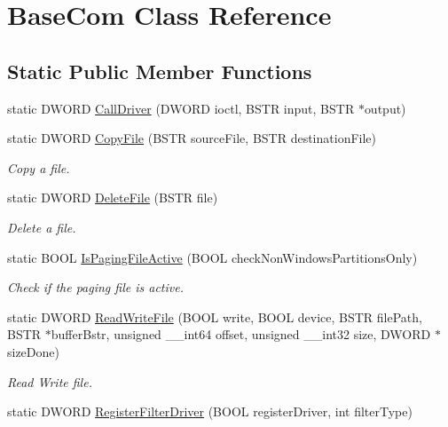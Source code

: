 \hypertarget{class_base_com}{}\section{Base\+Com Class Reference}
\label{class_base_com}
\subsection*{Static Public Member Functions}
\begin{DoxyCompactItemize}
\item 
static D\+W\+O\+RD \hyperlink{class_base_com_a975a72a5b377ede1d3106189b25f858b}{Call\+Driver} (D\+W\+O\+RD ioctl, B\+S\+TR input, B\+S\+TR $\ast$output)
\item 
static D\+W\+O\+RD \hyperlink{class_base_com_a27d575ad1ef51cac9f0167583db6ae06}{Copy\+File} (B\+S\+TR source\+File, B\+S\+TR destination\+File)
\begin{DoxyCompactList}\small\item\em Copy a file. \end{DoxyCompactList}\item 
static D\+W\+O\+RD \hyperlink{class_base_com_a52133219ed5ad54607a6c417de0ba666}{Delete\+File} (B\+S\+TR file)
\begin{DoxyCompactList}\small\item\em Delete a file. \end{DoxyCompactList}\item 
static B\+O\+OL \hyperlink{class_base_com_a41aa000a52c4c44d20b142c8868ef4ea}{Is\+Paging\+File\+Active} (B\+O\+OL check\+Non\+Windows\+Partitions\+Only)
\begin{DoxyCompactList}\small\item\em Check if the paging file is active. \end{DoxyCompactList}\item 
static D\+W\+O\+RD \hyperlink{class_base_com_a86bbb8fc7490090226ed6a27456271e4}{Read\+Write\+File} (B\+O\+OL write, B\+O\+OL device, B\+S\+TR file\+Path, B\+S\+TR $\ast$buffer\+Bstr, unsigned \+\_\+\+\_\+int64 offset, unsigned \+\_\+\+\_\+int32 size, D\+W\+O\+RD $\ast$size\+Done)
\begin{DoxyCompactList}\small\item\em Read Write file. \end{DoxyCompactList}\item 
static D\+W\+O\+RD \hyperlink{class_base_com_a42fbcfca1fecd24c6aeed62d5e86e6b1}{Register\+Filter\+Driver} (B\+O\+OL register\+Driver, int filter\+Type)

\end{DoxyCompactItemize}
